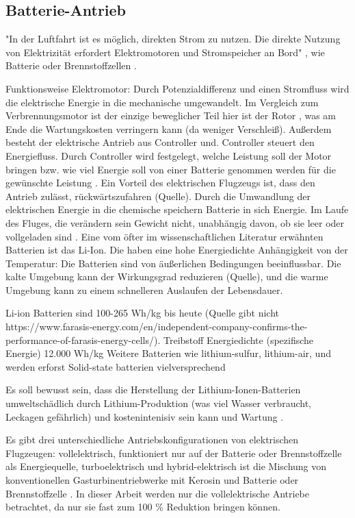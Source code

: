 \subsection{Batterie-Antrieb}
"In der Luftfahrt ist es möglich, direkten Strom zu nutzen. Die direkte Nutzung von
Elektrizität erfordert Elektromotoren und Stromspeicher an Bord" \cite{dahal2021techno}, wie Batterie oder Brennstoffzellen \cite{dalmia2022powering}.

Funktionsweise Elektromotor: Durch Potenzialdifferenz und einen Stromfluss wird die elektrische Energie in die mechanische umgewandelt.
Im Vergleich zum Verbrennungsmotor ist der einzige beweglicher Teil hier ist der Rotor \cite{donckers2024electric}, 
was am Ende die Wartungskosten verringern kann (da weniger Verschleiß). Außerdem besteht der elektrische Antrieb aus Controller und.
Controller steuert den Energiefluss. Durch Controller wird festgelegt, welche Leistung soll der Motor bringen bzw. wie viel Energie soll von 
einer Batterie genommen werden für die gewünschte Leistung \cite{donckers2024electric}.
Ein Vorteil des elektrischen Flugzeugs ist, dass den Antrieb zulässt, rückwärtszufahren (Quelle). Durch die Umwandlung der elektrischen Energie in die chemische 
speichern Batterie in sich Energie. 
Im Laufe des Fluges, die verändern sein Gewicht nicht, unabhängig davon, ob sie leer oder vollgeladen sind \cite{donckers2024electric}. 
Eine vom öfter im wissenschaftlichen Literatur erwähnten Batterien ist das Li-Ion. Die haben eine hohe Energiedichte
Anhängigkeit von der Temperatur: Die Batterien sind von äußerlichen Bedingungen beeinflussbar. Die kalte Umgebung kann 
der Wirkungsgrad reduzieren (Quelle), und die warme Umgebung kann zu einem schnelleren Auslaufen der Lebensdauer.

Li-ion Batterien sind 100-265 Wh/kg bis heute (Quelle gibt nicht https://www.farasis-energy.com/en/independent-company-confirms-the-performance-of-farasis-energy-cells/). 
Treibstoff Energiedichte (spezifische Energie) 12.000 Wh/kg \cite{dalmia2022powering}
Weitere Batterien wie lithium-sulfur, lithium-air, und werden erforst Solid-state batterien vielversprechend


Es soll bewusst sein, dass die Herstellung der Lithium-Ionen-Batterien umweltschädlich durch Lithium-Produktion (was viel Wasser verbraucht, Leckagen gefährlich) und kostenintenisiv 
sein kann und Wartung \cite{dalmia2022powering}. 

Es gibt drei unterschiedliche Antriebskonfigurationen von elektrischen Flugzeugen: vollelektrisch, funktioniert nur auf der Batterie oder
 Brennstoffzelle als Energiequelle, turboelektrisch und hybrid-elektrisch ist die Mischung von konventionellen 
 Gasturbinentriebwerke mit Kerosin und Batterie oder Brennstoffzelle \cite{dahal2021techno}. In dieser Arbeit werden nur die vollelektrische
 Antriebe betrachtet, da nur sie fast zum 100 \% Reduktion bringen können.



